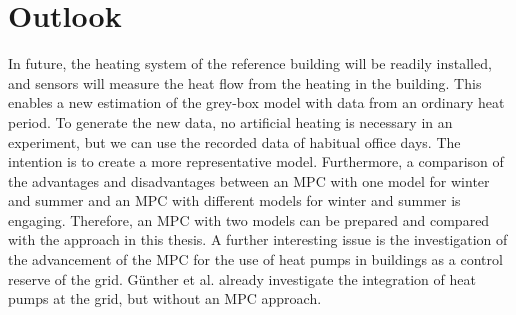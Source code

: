 \section{Outlook}
\label{sec:outlook}
In future, the heating system of the reference building will be readily installed, and sensors will measure the heat flow from the heating in the building. This enables a new estimation of the grey-box model with data from an ordinary heat period. To generate the new data, no artificial heating is necessary in an experiment, but we can use the recorded data of habitual office days. The intention is to create a more representative model.\newline
Furthermore, a comparison of the advantages and disadvantages between an MPC with one model for winter and summer and an MPC with different models for winter and summer is engaging. Therefore, an MPC with two models can be prepared and compared with the approach in this thesis.\newline
A further interesting issue is the investigation of the advancement of the MPC for the use of heat pumps in buildings as a control reserve of the grid. Günther et al. \cite{WPimBestand.2020} already investigate the integration of heat pumps at the grid, but without an MPC approach. 



%
